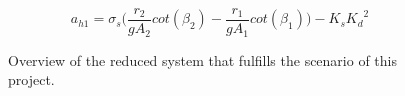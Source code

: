 \begin{equation}
  a_{h1} = \sigma_s 
  \bigg(\frac{r_2}{gA_2}cot(\beta_2)-\frac{r_1}{gA_1}cot(\beta_1)\bigg)-K_s{K_d}^2
\end{equation}



 
%
%
%
%
%
%



\begin{figure}[H]
\centering
 
\caption{Overview of the reduced system that fulfills the scenario of this project.}
\label{fig:sys_model_overview}
\end{figure}



